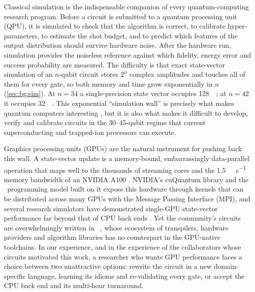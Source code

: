 Classical simulation is the indispensable companion of every quantum-computing research program. Before a circuit is submitted to a quantum processing unit (QPU), it is simulated to check that the algorithm is correct, to calibrate hyper-parameters, to estimate the shot budget, and to predict which features of the output distribution should survive hardware noise. After the hardware run, simulation provides the noiseless reference against which fidelity, energy error and success probability are measured. The difficulty is that exact state-vector simulation of an $n$-qubit circuit stores $2^{n}$ complex amplitudes and touches all of them for every gate, so both memory and time grow exponentially in $n$ (\cref{sec:bg:sim}). At $n=34$ a single-precision state vector occupies \SI{128}{\giga\byte}; at $n=42$ it occupies \SI{32}{\tera\byte}. This exponential ``simulation wall'' is precisely what makes quantum computers interesting \cite{arute2019supremacy,preskill2018nisq}, but it is also what makes it difficult to develop, verify and calibrate circuits in the 30--45-qubit regime that current superconducting and trapped-ion processors can execute.

Graphics processing units (GPUs) are the natural instrument for pushing back this wall. A state-vector update is a memory-bound, embarrassingly data-parallel operation that maps well to the thousands of streaming cores and the \SI{1.5}{\tera\byte\per\second} memory bandwidth of an NVIDIA A100 \cite{choquette2021a100}. NVIDIA's cuQuantum library \cite{bayraktar2023cuquantum} and the \cudaq\ programming model built on it \cite{kim2023cudaquantum} expose this hardware through kernels that can be distributed across many GPUs with the Message Passing Interface (MPI), and several research simulators have demonstrated single-GPU state-vector performance far beyond that of CPU back ends \cite{suzuki2021qulacs,vanbeeumen2023qclabpp,doi2023multishotgpu,asadi2024pennylanelightning}. Yet the community's circuits are overwhelmingly written in \qiskit\ \cite{javadiabhari2024qiskit}, whose ecosystem of transpilers, hardware providers and algorithm libraries has no counterpart in the GPU-native toolchains. In our experience, and in the experience of the collaborators whose circuits motivated this work, a researcher who wants GPU performance faces a choice between two unattractive options: rewrite the circuit in a new domain-specific language, learning its idioms and re-validating every gate, or accept the CPU back end and its multi-hour turnaround.


